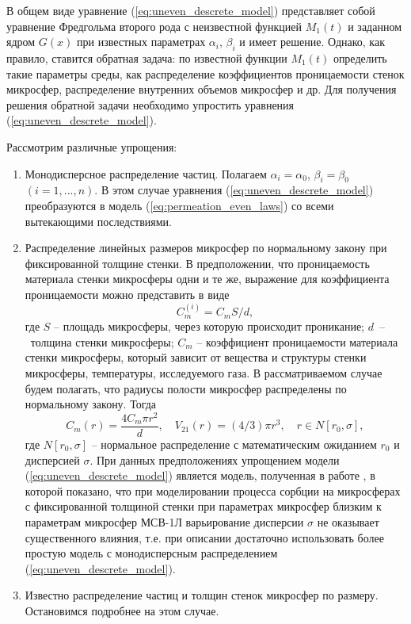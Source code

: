 В общем виде уравнение (\ref{eq:uneven_descrete_model}) представляет собой уравнение Фредгольма второго рода с неизвестной функцией $M_1(t)$ и заданном ядром $G(x)$ при известных параметрах $\alpha_i$, $\beta_i$ и имеет решение. Однако, как правило, ставится обратная задача: по известной функции $M_1(t)$ определить такие параметры среды, как распределение коэффициентов проницаемости стенок микросфер, распределение внутренних объемов микросфер и др. Для получения решения обратной задачи необходимо упростить уравнения (\ref{eq:uneven_descrete_model}). 

Рассмотрим различные упрощения:
\begin{enumerate}
	\item Монодисперсное распределение частиц. Полагаем $\alpha_i=\alpha_0$, $\beta_i=\beta_0$ $(i=1,...,n)$. В этом случае уравнения (\ref{eq:uneven_descrete_model}) преобразуются в модель (\ref{eq:permeation_even_laws}) со всеми вытекающими последствиями.
	\item Распределение линейных размеров микросфер по нормальному закону при фиксированной толщине стенки.  В предположении, что проницаемость материала стенки микросферы одни и те же, выражение для коэффициента проницаемости можно представить в виде
	\[
	C_m^{(i)} = C_m S/d,
	\]
	где $S$ -- площадь микросферы, через которую происходит проникание; $d$~--~толщина стенки микросферы; $C_m$ -- коэффициент проницаемости материала стенки микросферы, который зависит от 
	вещества и структуры стенки микросферы, температуры, исследуемого газа. В рассматриваемом случае будем полагать, что радиусы полости микросфер распределены по нормальному закону. Тогда
	\[
	C_m(r) =\frac{4 C_m \pi r^2}{d},\quad V_{21}(r)=(4/3) \pi r^3, \quad r \in N[r_0, \sigma],
	\]
	где $N[r_0, \sigma]$ -- нормальное распределение с математическим ожиданием $r_0$ и дисперсией $\sigma$. При данных предположениях упрощением модели (\ref{eq:uneven_descrete_model})  является модель, полученная в работе \cite{Ver_Norm_Dist}, в которой показано, что при моделировании процесса сорбции на микросферах с фиксированной толщиной стенки при параметрах микросфер близким к параметрам микросфер МСВ-1Л варьирование дисперсии $\sigma$ не оказывает существенного влияния, т.е. при описании достаточно использовать более простую модель с монодисперсным распределением (\ref{eq:uneven_descrete_model}).
	\item Известно распределение частиц и толщин стенок микросфер по размеру. Остановимся подробнее на этом случае.
\end{enumerate}

